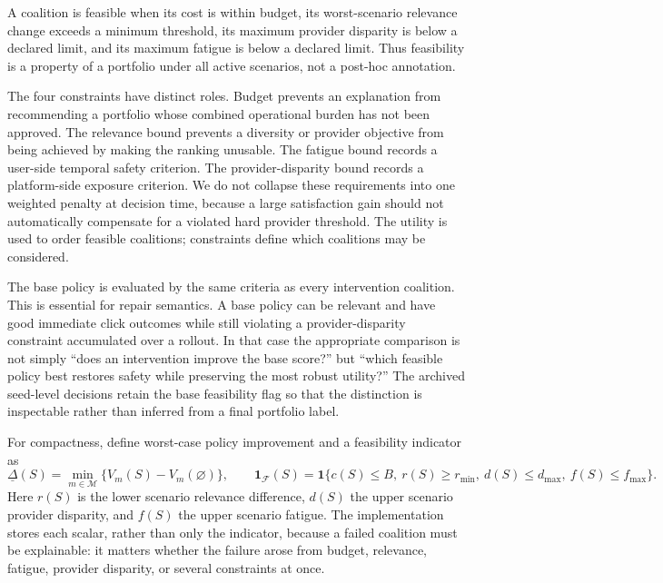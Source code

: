 \documentclass[pdflatex,sn-mathphys-num]{sn-jnl}
\theoremstyle{thmstyleone}
\theoremstyle{thmstyletwo}
\theoremstyle{thmstylethree}
\newcommand{\Models}{\mathcal{M}}
\newcommand{\Utility}{V}
\begin{document}
A coalition is feasible when its cost is within budget, its worst-scenario relevance change exceeds a minimum threshold, its maximum provider disparity is below a declared limit, and its maximum fatigue is below a declared limit. Thus feasibility is a property of a portfolio under all active scenarios, not a post-hoc annotation.

The four constraints have distinct roles. Budget prevents an explanation from recommending a portfolio whose combined operational burden has not been approved. The relevance bound prevents a diversity or provider objective from being achieved by making the ranking unusable. The fatigue bound records a user-side temporal safety criterion. The provider-disparity bound records a platform-side exposure criterion. We do not collapse these requirements into one weighted penalty at decision time, because a large satisfaction gain should not automatically compensate for a violated hard provider threshold. The utility is used to order feasible coalitions; constraints define which coalitions may be considered.

The base policy is evaluated by the same criteria as every intervention coalition. This is essential for repair semantics. A base policy can be relevant and have good immediate click outcomes while still violating a provider-disparity constraint accumulated over a rollout. In that case the appropriate comparison is not simply ``does an intervention improve the base score?'' but ``which feasible policy best restores safety while preserving the most robust utility?'' The archived seed-level decisions retain the base feasibility flag so that the distinction is inspectable rather than inferred from a final portfolio label.

For compactness, define worst-case policy improvement and a feasibility indicator as
\begin{equation}
 \underline{\Delta}(S)=\min_{m\in\Models}\{\Utility_m(S)-\Utility_m(\varnothing)\},
 \qquad
 \mathbf{1}_{\mathcal F}(S)=\mathbf{1}\{c(S)\leq B,\ r(S)\geq r_{\min},\ d(S)\leq d_{\max},\ f(S)\leq f_{\max}\}.
\label{eq:robust-feasibility}
\end{equation}
Here $r(S)$ is the lower scenario relevance difference, $d(S)$ the upper scenario provider disparity, and $f(S)$ the upper scenario fatigue. The implementation stores each scalar, rather than only the indicator, because a failed coalition must be explainable: it matters whether the failure arose from budget, relevance, fatigue, provider disparity, or several constraints at once.
\end{document}
